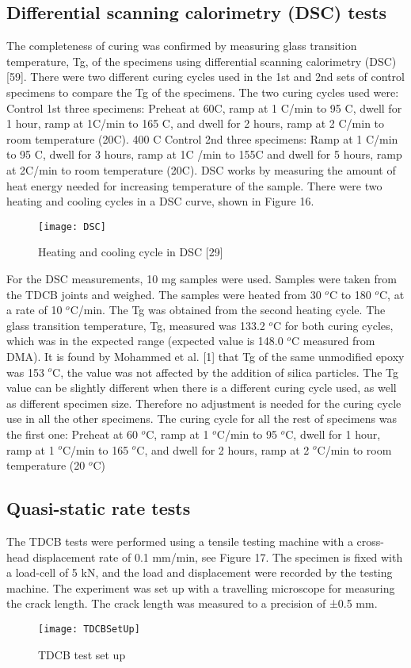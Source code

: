 \documentclass[numbers=noendperiod,chapterprefix=on]{icldt} %
\begin{document}
\subsection{Differential scanning calorimetry (DSC) tests}
The completeness of curing was confirmed by measuring glass transition temperature, Tg, of the specimens using differential scanning calorimetry (DSC) [59]. There were two different curing cycles used in the 1st and 2nd sets of control specimens to compare the Tg of the specimens.
The two curing cycles used were:
Control 1st three specimens: Preheat at 60\degree C, ramp at 1 \degree C/min to 95 \degree C, dwell for 1 hour, ramp at 1\degree C/min to 165 \degree C, and dwell for 2 hours, ramp at 2 \degree C/min to room temperature (20\degree C). 400 \degree C 
Control 2nd three specimens: Ramp at 1 \degree C/min to 95 \degree C, dwell for 3 hours, ramp at 1\degree C /min to 155\degree C and dwell for 5 hours, ramp at 2\degree C/min to room temperature (20\degree C).
DSC works by measuring the amount of heat energy needed for increasing temperature of the sample. There were two heating and cooling cycles in a DSC curve, shown in Figure 16.

\begin{figure}[!htpb]
\centering
\texttt{[image: DSC]}
\caption{Heating and cooling cycle in DSC [29]} %
\end{figure}

For the DSC measurements, 10 mg samples were used. Samples were taken from the TDCB joints and weighed. The samples were heated from 30 $^o$C to 180 $^o$C, at a rate of 10 $^o$C/min. The Tg was obtained from the second heating cycle. The glass transition temperature, Tg, measured was 133.2 $^o$C for both curing cycles, which was in the expected range (expected value is 148.0 $^o$C measured from DMA). It is found by Mohammed et al. [1] that Tg of the same unmodified epoxy was 153 $^o$C, the value was not affected by the addition of silica particles. The Tg value can be slightly different when there is a different curing cycle used, as well as different specimen size. Therefore no adjustment is needed for the curing cycle use in all the other specimens. The curing cycle for all the rest of specimens was the first one: Preheat at 60 $^o$C, ramp at 1 $^o$C/min to 95 $^o$C, dwell for 1 hour, ramp at 1 $^o$C/min to 165 $^o$C, and dwell for 2 hours, ramp at 2 $^o$C/min to room temperature (20 $^o$C)

\subsection{Quasi-static rate tests}
The TDCB tests were performed using a tensile testing machine with a cross-head displacement rate of 0.1 mm/min, see Figure 17. The specimen is fixed with a load-cell of 5 kN, and the load and displacement were recorded by the testing machine. The experiment was set up with a travelling microscope for measuring the crack length. The crack length was measured to a precision of ±0.5 mm.
\begin{figure}[!htpb]
\centering
\texttt{[image: TDCBSetUp]}
\caption{TDCB test set up} %
\end{figure}
\end{document}
